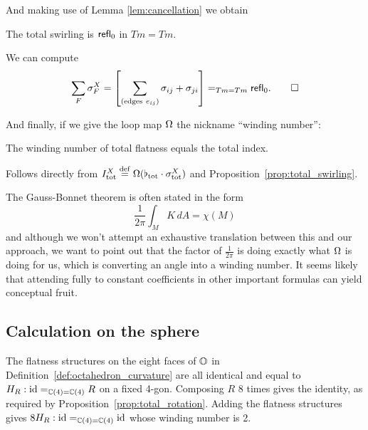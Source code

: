 And making use of Lemma \ref{lem:cancellation} we obtain
\begin{myprop}The total swirling is \( \mathsf{refl}_0 \) in \( Tm=Tm \).\label{prop:total_swirling}
\end{myprop}
\begin{myproof}We can compute
\[\sum_F\sigma^X_F=\left[\sum_{(\mathrm{edges\ }e_{ij})}\sigma_{ij}+\sigma_{ji}\right]=_{Tm=Tm}\refl_0.\qedhere\]
\end{myproof}

And finally, if we give the loop map \( \Omega \) the nickname ``winding number'':

\begin{mythm}\label{thm:total_index_total_curvature}The winding number of total flatness equals the total index.
\end{mythm}
\begin{myproof}
Follows directly from \( I^X_{\mathrm{tot}}\stackrel{\mathrm{def}}{=}\Omega(\flat_{\mathrm{tot}}\cdot \sigma^X_{\mathrm{tot}}) \) and Proposition~\ref{prop:total_swirling}.
\end{myproof}

\begin{mynote}
The Gauss-Bonnet theorem is often stated in the form \[\frac{1}{2\pi}\int_M K\,dA=\chi(M)\] and although we won't attempt an exhaustive translation between this and our approach, we want to point out that the factor of \( \frac{1}{2\pi} \) is doing exactly what \( \Omega \) is doing for us, which is converting an angle into a winding number. It seems likely that attending fully to constant coefficients in other important formulas can yield conceptual fruit.
\end{mynote}

\subsection{Calculation on the sphere}
The flatness structures on the eight faces of \( \mathbb{O} \) in Definition~\ref{def:octahedron_curvature} are all identical and equal to \( H_R:\text{id}=_{\mathbb{C}(4)=\mathbb{C}(4)}R \) on a fixed 4-gon. Composing \( R \) 8 times gives the identity, as required by Proposition~\ref{prop:total_rotation}. Adding the flatness structures gives \( 8H_R:\text{id}=_{\mathbb{C}(4)=\mathbb{C}(4)}\text{id} \) whose winding number is 2.

